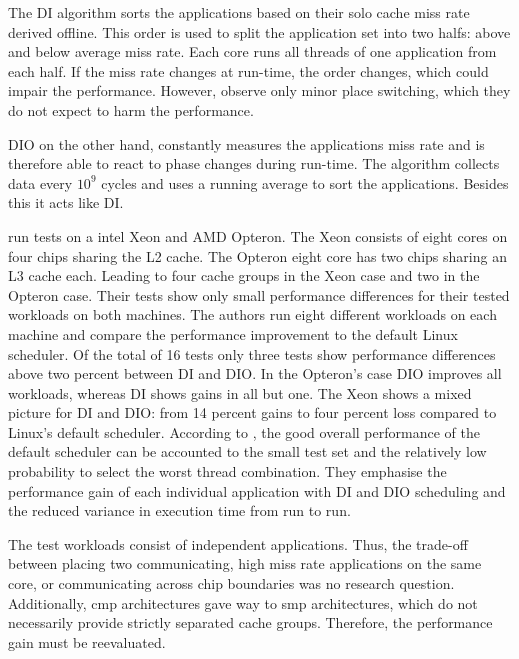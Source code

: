 The DI algorithm sorts the applications based on their solo cache miss rate derived
offline.
This order is used to split the application set into two halfs: above and below
average miss rate.
Each core runs all threads of one application from each half.
If the miss rate changes at run-time, the order changes, which could impair
the performance.
However, \citeauthor{zhuravlev_addressing_2010} observe only minor place
switching, which they do not expect to harm the performance.

DIO on the other hand, constantly measures the applications miss rate and is
therefore able to react to phase changes during run-time.
The algorithm collects data every $10^9$ cycles and uses a running average to
sort the applications.
Besides this it acts like DI.

\citeauthor{zhuravlev_addressing_2010} run tests on a \gls{intel}
Xeon and AMD Opteron.
The Xeon consists of eight cores on four chips sharing the L2 cache.
The Opteron eight core has two chips sharing an L3 cache each.
Leading to four cache groups in the Xeon case and two in the Opteron case.
Their tests show only small performance differences for their tested workloads
on both machines.
The authors run eight different workloads on each machine and compare the
performance improvement to the default Linux scheduler.
Of the total of 16 tests only three tests show performance differences above
two percent between DI and DIO.
In the Opteron's case DIO improves all workloads, whereas DI shows gains in
all but one.
The Xeon shows a mixed picture for DI and DIO: from 14 percent gains to four
percent loss compared to Linux's default scheduler.
According to \citeauthor{zhuravlev_addressing_2010}, the good overall
performance of the default scheduler can be accounted to the small test set and
the relatively low probability to select the worst thread combination.
They emphasise the performance gain of each individual application with DI and
DIO scheduling and the reduced variance in execution time from run to run.

The test workloads consist of independent applications.
Thus, the trade-off between placing two communicating, high miss rate
applications on the same core, or communicating across chip boundaries was no
research question.
Additionally, \gls{cmp} architectures gave way to \gls{smp} architectures,
which do not necessarily provide strictly separated cache groups.
Therefore, the performance gain must be reevaluated.
\\

